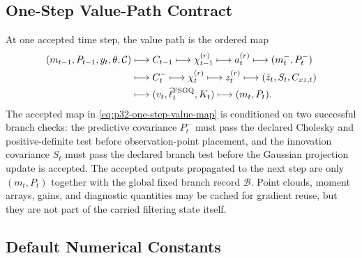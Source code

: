 \documentclass[11pt]{article}
\numberwithin{equation}{section}
\newcommand{\ellhat}{\widehat\ell}
\begin{document}
\subsection{One-Step Value-Path Contract}
\label{subsec:p32-one-step-value-contract}

At one accepted time step, the value path is the ordered map
\begin{equation}
\begin{aligned}
  (m_{t-1},P_{t-1},y_t,\theta,\mathcal C)
  &\longmapsto C_{t-1}
  \longmapsto \chi_{t-1}^{(r)}
  \longmapsto a_t^{(r)}
  \longmapsto (m_t^-,P_t^-) \\
  &\longmapsto C_t^-
  \longmapsto \chi_t^{(r)}
  \longmapsto z_t^{(r)}
  \longmapsto (\bar z_t,S_t,C_{xz,t}) \\
  &\longmapsto (v_t,\ellhat_t^{\rm FSGQ},K_t)
  \longmapsto (m_t,P_t).
\end{aligned}
  \label{eq:p32-one-step-value-map}
\end{equation}
The accepted map in \eqref{eq:p32-one-step-value-map} is conditioned on two
successful branch checks: the predictive covariance \(P_t^-\) must pass the
declared Cholesky and positive-definite test before observation-point
placement, and the innovation covariance \(S_t\) must pass the declared branch
test before the Gaussian projection update is accepted.  The accepted outputs
propagated to the next step are only
\((m_t,P_t)\) together with the global fixed branch record \(\mathcal B\).
Point clouds, moment arrays, gains, and diagnostic quantities may be cached for
gradient reuse, but they are not part of the carried filtering state itself.

\subsection{Default Numerical Constants}
\label{sec:p32-defaults}
\end{document}
